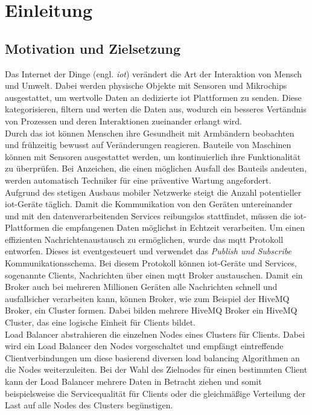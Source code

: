\section{Einleitung}
\subsection{Motivation und Zielsetzung}
Das Internet der Dinge (engl. \textit{\ac{iot}}) verändert die Art der Interaktion von Mensch und Umwelt. Dabei werden physische Objekte mit Sensoren und Mikrochips ausgestattet, um wertvolle Daten an dedizierte \ac{iot} Plattformen zu senden. Diese kategorisieren, filtern und werten die Daten aus, wodurch ein besseres Vertändnis von Prozessen und deren Interaktionen zueinander erlangt wird.
\\
Durch das \acl{iot} können Menschen ihre Gesundheit mit Armbändern beobachten und frühzeitig bewusst auf Veränderungen reagieren. Bauteile von Maschinen können mit Sensoren ausgestattet werden, um kontinuierlich ihre Funktionalität zu überprüfen. Bei Anzeichen, die einen möglichen Ausfall des Bauteils andeuten, werden automatisch Techniker für eine präventive Wartung angefordert.
\\
Aufgrund des stetigen Ausbaus mobiler Netzwerke steigt die Anzahl potentieller \ac{iot}-Geräte täglich. Damit die Kommunikation von den Geräten untereinander und mit den datenverarbeitenden Services reibungslos stattfindet, müssen die \ac{iot}-Plattformen die empfangenen Daten möglichst in Echtzeit verarbeiten.
Um einen effizienten Nachrichtenaustausch zu ermöglichen, wurde das \ac{mqtt} Protokoll entworfen.
Dieses ist eventgesteuert und verwendet das \textit{Publish und Subscribe} Kommunikationsschema.
Bei diesem Protokoll können \ac{iot}-Geräte und Services, sogenannte Clients, Nachrichten über einen \ac{mqtt} Broker austauschen.
Damit ein Broker auch bei mehreren Millionen Geräten alle Nachrichten schnell und ausfallsicher verarbeiten kann, können Broker, wie zum Beispiel der HiveMQ Broker, ein Cluster formen. Dabei bilden mehrere HiveMQ Broker ein HiveMQ Cluster, das eine logische Einheit für Clients bildet.
\\
Load Balancer abstrahieren die einzelnen Nodes eines Clusters für Clients.
Dabei wird ein Load Balancer den Nodes vorgeschaltet und empfängt eintreffende Clientverbindungen um diese basierend diversen load balancing Algorithmen an die Nodes weiterzuleiten.
Bei der Wahl des Zielnodes für einen bestimmten Client kann der Load Balancer mehrere Daten in Betracht ziehen und somit beispielsweise die Servicequalität für Clients oder die gleichmä{\ss}ige Verteilung der Last auf alle Nodes des Clusters begünstigen.
